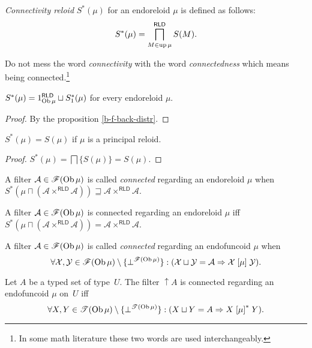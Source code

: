 \begin{defn}
\emph{Connectivity reloid} $S^{\ast}(\mu)$
for an endoreloid $\mu$ is defined as follows: 
\[
S^{\ast}(\mu)=\bigsqcap_{M\in\operatorname{up}\mu}^{\mathsf{RLD}}S(M).
\]

\end{defn}
Do not mess the word \emph{connectivity} with the word \emph{connectedness}
which means being connected.\footnote{In some math literature these two words are used interchangeably.}
\begin{prop}
$S^{\ast}(\mu)=1_{\operatorname{Ob}\mu}^{\mathsf{RLD}}\sqcup S_{1}^{\ast}(\mu)$
for every endoreloid $\mu$.\end{prop}
\begin{proof}
By the proposition \ref{b-f-back-distr}.\end{proof}
\begin{prop}
$S^{\ast}(\mu)=S(\mu)$ if $\mu$ is a principal reloid.\end{prop}
\begin{proof}
$S^{\ast}(\mu)=\bigsqcap\{S(\mu)\}=S(\mu)$.\end{proof}
\begin{defn}
A filter $\mathcal{A}\in\mathscr{F}(\operatorname{Ob}\mu)$
is called \emph{connected} regarding an endoreloid $\mu$ when $S^{\ast}(\mu\sqcap(\mathcal{A}\times^{\mathsf{RLD}}\mathcal{A}))\sqsupseteq\mathcal{A}\times^{\mathsf{RLD}}\mathcal{A}$.\end{defn}
\begin{obvious}
A filter $\mathcal{A}\in\mathscr{F}(\operatorname{Ob}\mu)$ is connected regarding
an endoreloid $\mu$ iff $S^{\ast}(\mu\sqcap(\mathcal{A}\times^{\mathsf{RLD}}\mathcal{A}))=\mathcal{A}\times^{\mathsf{RLD}}\mathcal{A}$.\end{obvious}
\begin{defn}
A filter $\mathcal{A}\in\mathscr{F}(\operatorname{Ob}\mu)$
is called \emph{connected} regarding an endofuncoid $\mu$ when
\[
\forall\mathcal{X},\mathcal{Y}\in\mathscr{F}(\operatorname{Ob}\mu)\setminus\{\bot^{\mathscr{F}(\operatorname{Ob}\mu)}\}:(\mathcal{X}\sqcup\mathcal{Y}=\mathcal{A}\Rightarrow\mathcal{X}\mathrel{\left[\mu\right]}\mathcal{Y}).
\]
\end{defn}
\begin{prop}
Let $A$ be a typed set of type~$U$. The filter $\uparrow A$ is
connected regarding an endofuncoid $\mu$ on~$U$ iff
\[
\forall X,Y\in\mathscr{T}(\operatorname{Ob}\mu)\setminus\{\bot^{\mathscr{T}(\operatorname{Ob}\mu)}\}:(X\sqcup Y=A\Rightarrow X\mathrel{\left[\mu\right]^{\ast}}Y).
\]
\end{prop}
